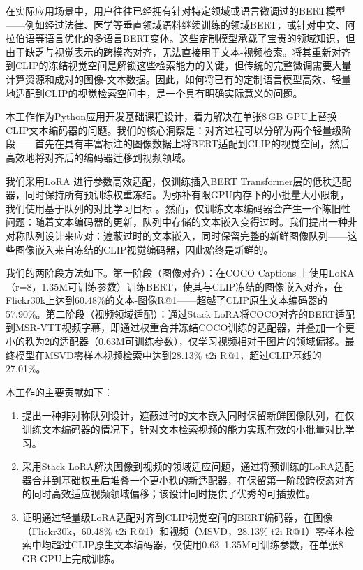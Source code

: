 \documentclass[10pt,a4paper]{ctexart}
\begin{document}
在实际应用场景中，用户往往已经拥有针对特定领域或语言微调过的BERT模型——例如经过法律、医学等垂直领域语料继续训练的领域BERT，或针对中文、阿拉伯语等语言优化的多语言BERT变体。这些定制模型承载了宝贵的领域知识，但由于缺乏与视觉表示的跨模态对齐，无法直接用于文本-视频检索。将其重新对齐到CLIP的冻结视觉空间是解锁这些检索能力的关键，但传统的完整微调需要大量计算资源和成对的图像-文本数据。因此，如何将已有的定制语言模型高效、轻量地适配到CLIP的视觉检索空间中，是一个具有明确实际意义的问题。

本工作作为Python应用开发基础课程设计，着力解决在单张8\,GB GPU上替换CLIP文本编码器的问题。我们的核心洞察是：对齐过程可以分解为两个轻量级阶段——首先在具有丰富标注的图像数据上将BERT适配到CLIP的视觉空间，然后高效地将对齐后的编码器迁移到视频领域。

我们采用LoRA \citep{hu2022lora}进行参数高效适配，仅训练插入BERT Transformer层的低秩适配器，同时保持所有预训练权重冻结。为弥补有限GPU内存下的小批量大小限制，我们使用基于队列的对比学习目标 \citep{he2020moco}。然而，仅训练文本编码器会产生一个陈旧性问题：随着文本编码器的更新，队列中存储的文本嵌入变得过时。我们提出一种非对称队列设计来应对：遮蔽过时的文本嵌入，同时保留完整的新鲜图像队列——这些图像嵌入来自冻结的CLIP视觉编码器，因此始终是新鲜的。

我们的两阶段方法如下。第一阶段（图像对齐）：在COCO Captions \citep{lin2014coco}上使用LoRA（r=8，1.35M可训练参数）训练BERT，使其与CLIP冻结的图像嵌入对齐，在Flickr30k上达到60.48\%的文本-图像R@1——超越了CLIP原生文本编码器的57.90\%。第二阶段（视频领域适配）：通过Stack LoRA将COCO对齐的BERT适配到MSR-VTT视频字幕，即通过权重合并冻结COCO训练的适配器，并叠加一个更小的秩为2的适配器（0.63M可训练参数），仅学习视频相对于图片的领域偏移。最终模型在MSVD零样本视频检索中达到28.13\% t2i R@1，超过CLIP基线的27.01\%。

本工作的主要贡献如下：

\begin{enumerate}
  \item 提出一种非对称队列设计，遮蔽过时的文本嵌入同时保留新鲜图像队列，在仅训练文本编码器的情况下，针对文本检索视频的能力实现有效的小批量对比学习。
  \item 采用Stack LoRA解决图像到视频的领域适应问题，通过将预训练的LoRA适配器合并到基础权重后堆叠一个更小秩的新适配器，在保留第一阶段跨模态对齐的同时高效适应视频领域偏移；该设计同时提供了优秀的可插拔性。
  \item 证明通过轻量级LoRA适配对齐到CLIP视觉空间的BERT编码器，在图像（Flickr30k，60.48\% t2i R@1）和视频（MSVD，28.13\% t2i R@1）零样本检索中均超过CLIP原生文本编码器，仅使用0.63--1.35M可训练参数，在单张8\,GB GPU上完成训练。
\end{enumerate}
\end{document}
